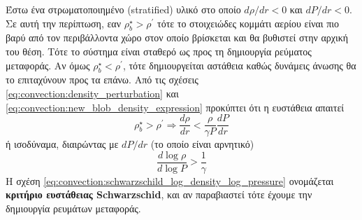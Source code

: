 Έστω ένα στρωματοποιημένο (stratified) υλικό στο οποίο $d\rho/dr < 0$ και $dP/dr < 0 $. Σε αυτή την περίπτωση, εαν $\rho_b^{\star} > \rho^{\prime}$ τότε το στοιχειώδες κομμάτι αερίου είναι πιο βαρύ από τον περιβάλλοντα χώρο στον οποίο βρίσκεται και θα βυθιστεί στην αρχική του θέση. Τότε το σύστημα είναι σταθερό ως προς τη δημιουργία ρεύματος μεταφοράς. Αν όμως $\rho_b^{\star} < \rho^{\prime}$, τότε δημιουργείται αστάθεια καθώς δυνάμεις άνωσης θα το επιταχύνουν προς τα επάνω. Από τις σχέσεις \eqref{eq:convection:density_perturbation} και \eqref{eq:convection:new_blob_density_expression} προκύπτει ότι η ευστάθεια απαιτεί
\begin{equation}
    \label{eq:convection:schwarzschild_density_pressure}
    \rho_b^{\star} > \rho^{\prime} \Rightarrow \boxed{\frac{d\rho}{dr} < \frac{\rho}{\gamma P} \frac{dP}{dr}}
\end{equation}
ή ισοδύναμα, διαιρώντας με $dP/dr$ (το οποίο είναι αρνητικό)
\begin{equation}
    \label{eq:convection:schwarzschild_log_density_log_pressure}
    \boxed{\frac{d\log \rho}{d\log P} > \frac{1}{\gamma}}
\end{equation}
Η σχέση \eqref{eq:convection:schwarzschild_log_density_log_pressure} ονομάζεται \textbf{κριτήριο ευστάθειας Schwarzschid}, και αν παραβιαστεί τότε έχουμε την δημιουργία ρευμάτων μεταφοράς.

